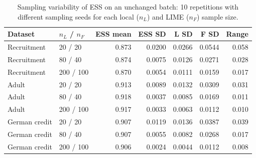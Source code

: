 \begin{table}[t]
\centering
\caption{Sampling variability of ESS on an unchanged batch: 10 repetitions with different sampling seeds for each local ($n_L$) and LIME ($n_F$) sample size.}
\label{tab:variance}
\small
\setlength{\tabcolsep}{4pt}
\begin{tabular}{llrrrrr}
\toprule
Dataset & $n_L$ / $n_F$ & ESS mean & ESS SD & L SD & F SD & Range \\
\midrule
Recruitment & 20 / 20 & 0.873 & 0.0200 & 0.0266 & 0.0544 & 0.058 \\
Recruitment & 80 / 40 & 0.874 & 0.0075 & 0.0126 & 0.0271 & 0.028 \\
Recruitment & 200 / 100 & 0.870 & 0.0054 & 0.0111 & 0.0159 & 0.017 \\
Adult & 20 / 20 & 0.913 & 0.0089 & 0.0132 & 0.0309 & 0.031 \\
Adult & 80 / 40 & 0.918 & 0.0037 & 0.0085 & 0.0169 & 0.011 \\
Adult & 200 / 100 & 0.917 & 0.0033 & 0.0063 & 0.0112 & 0.010 \\
German credit & 20 / 20 & 0.907 & 0.0119 & 0.0136 & 0.0387 & 0.039 \\
German credit & 80 / 40 & 0.907 & 0.0055 & 0.0082 & 0.0268 & 0.017 \\
German credit & 200 / 100 & 0.906 & 0.0024 & 0.0044 & 0.0112 & 0.008 \\
\bottomrule
\end{tabular}
\end{table}
